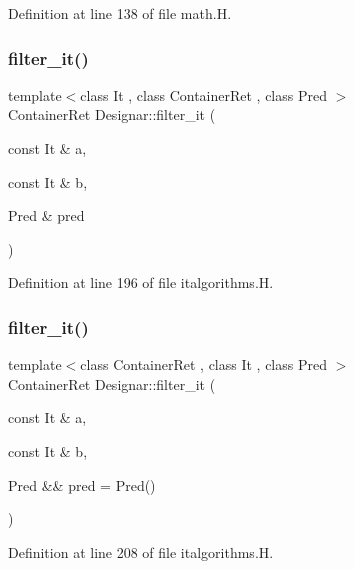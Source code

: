 Definition at line 138 of file math.\+H.

\mbox{\label{namespace_designar_a2e9a7f0c3737ea50acaaa849e78792ac}} 
\subsubsection{\texorpdfstring{filter\+\_\+it()}{filter\_it()}\hspace{0.1cm}{\footnotesize\ttfamily [1/2]}}
{\footnotesize\ttfamily template$<$class It , class Container\+Ret , class Pred $>$ \\
Container\+Ret Designar\+::filter\+\_\+it (\begin{DoxyParamCaption}\item[{const It \&}]{a,  }\item[{const It \&}]{b,  }\item[{Pred \&}]{pred }\end{DoxyParamCaption})}



Definition at line 196 of file italgorithms.\+H.

\mbox{\label{namespace_designar_a0eadd36ecf06d087630130873fdc6a49}} 
\subsubsection{\texorpdfstring{filter\+\_\+it()}{filter\_it()}\hspace{0.1cm}{\footnotesize\ttfamily [2/2]}}
{\footnotesize\ttfamily template$<$class Container\+Ret , class It , class Pred $>$ \\
Container\+Ret Designar\+::filter\+\_\+it (\begin{DoxyParamCaption}\item[{const It \&}]{a,  }\item[{const It \&}]{b,  }\item[{Pred \&\&}]{pred = {\ttfamily Pred()} }\end{DoxyParamCaption})}



Definition at line 208 of file italgorithms.\+H.

\mbox{\label{namespace_designar_a52cb61c301573a55b73956eed7d86ed9}} 
